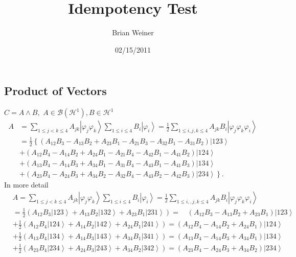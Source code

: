 \documentclass[aps,preprint]{revtex4}%
\begin{document}
\preprint{ }
\title{Idempotency Test}
\author{Brian Weiner}
\date{02/15/2011}
\maketitle
\tableofcontents


\subsection{Product of Vectors}

$C=A\wedge B,$ $A\in\mathcal{B}\left(  \mathcal{H}^{1}\right)  ,B\in
\mathcal{H}^{1}$%
\begin{align}
A &  =\sum_{1\leq j<k\leq4}A_{jk}\left\vert \varphi_{j}\varphi_{k}%
\right\rangle \sum_{1\leq i\leq4}B_{i}\left\vert \varphi_{i}\right\rangle
=\frac{1}{2}\sum_{1\leq i,j,k\leq4}A_{jk}B_{i}\left\vert \varphi_{j}%
\varphi_{k}\varphi_{i}\right\rangle \nonumber\\
&  =\frac{1}{2}\left\{  \left(  A_{12}B_{3}-A_{13}B_{2}+A_{23}B_{1}%
-A_{21}B_{3}-A_{32}B_{1}-A_{31}B_{2}\right)  \left\vert 123\right\rangle
\right.  \nonumber\\
&  +\left(  A_{12}B_{4}-A_{14}B_{2}+A_{24}B_{1}-A_{21}B_{4}-A_{42}B_{1}%
-A_{41}B_{2}\right)  \left\vert 124\right\rangle \nonumber\\
&  +\left(  A_{13}B_{4}-A_{14}B_{3}+A_{34}B_{1}-A_{31}B_{4}-A_{43}B_{1}%
-A_{41}B_{3}\right)  \left\vert 134\right\rangle \nonumber\\
&  \left.  +\left(  A_{23}B_{4}-A_{24}B_{3}+A_{34}B_{2}-A_{32}B_{4}%
-A_{43}B_{2}-A_{42}B_{3}\right)  \left\vert 234\right\rangle \right\}  .
\end{align}
In more detail%
\begin{align}
&  A=\sum_{1\leq j<k\leq4}A_{jk}\left\vert \varphi_{j}\varphi_{k}\right\rangle
\sum_{1\leq i\leq4}B_{i}\left\vert \varphi_{i}\right\rangle =\frac{1}{2}%
\sum_{1\leq i,,j,k\leq4}A_{jk}B_{i}\left\vert \varphi_{j}\varphi_{k}%
\varphi_{i}\right\rangle \nonumber\\
&  =\frac{1}{2}\left(  A_{12}B_{3}\left\vert 123\right\rangle +A_{13}%
B_{2}\left\vert 132\right\rangle +A_{23}B_{1}\left\vert 231\right\rangle
\right)  =\quad\left(  A_{12}B_{3}-A_{13}B_{2}+A_{23}B_{1}\right)  \left\vert
123\right\rangle \nonumber\\
&  \left.  +\right.  \frac{1}{2}\left(  A_{12}B_{4}\left\vert 124\right\rangle
+A_{14}B_{2}\left\vert 142\right\rangle +A_{24}B_{1}\left\vert
241\right\rangle \right)  =\left(  A_{12}B_{4}-A_{14}B_{2}+A_{24}B_{1}\right)
\left\vert 124\right\rangle \nonumber\\
&  \left.  +\right.  \frac{1}{2}\left(  A_{13}B_{4}\left\vert 134\right\rangle
+A_{14}B_{3}\left\vert 143\right\rangle +A_{34}B_{1}\left\vert
341\right\rangle \right)  =\left(  A_{13}B_{4}-A_{14}B_{3}+A_{34}B_{1}\right)
\left\vert 134\right\rangle \nonumber\\
&  \left.  +\right.  \frac{1}{2}\left(  A_{23}B_{4}\left\vert 234\right\rangle
+A_{24}B_{3}\left\vert 243\right\rangle +A_{34}B_{2}\left\vert
342\right\rangle \right)  =\left(  A_{23}B_{4}-A_{24}B_{3}+A_{34}B_{2}\right)
\left\vert 234\right\rangle
\end{align}
\end{document}
